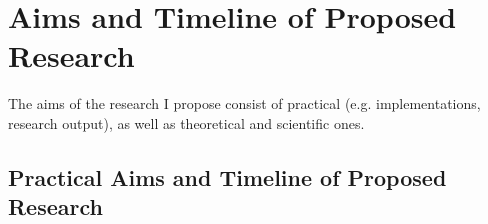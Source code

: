 \documentclass[12pt]{article}
\begin{document}
%

\section*{Aims and Timeline of Proposed Research}

The aims of the research I propose consist of practical (e.g. implementations, research output), as well as theoretical and scientific ones.

\subsection*{Practical Aims and Timeline of Proposed Research}
\end{document}
